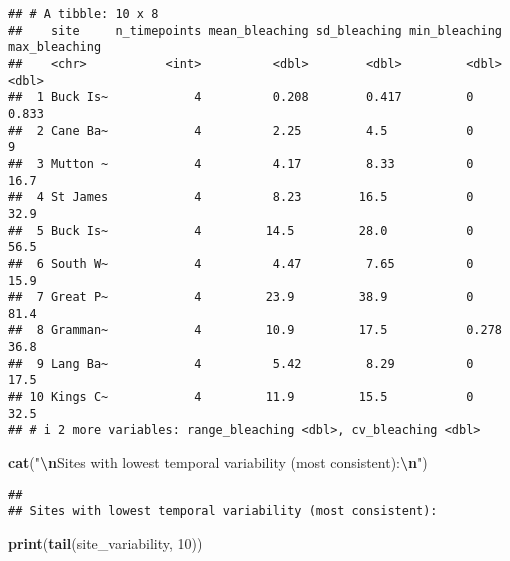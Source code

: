 \documentclass[
]{article}
\newenvironment{Shaded}{\begin{snugshade}}{\end{snugshade}}
\newcommand{\DecValTok}[1]{\textcolor[rgb]{0.00,0.00,0.81}{#1}}
\newcommand{\FunctionTok}[1]{\textcolor[rgb]{0.13,0.29,0.53}{\textbf{#1}}}
\newcommand{\NormalTok}[1]{#1}
\newcommand{\SpecialCharTok}[1]{\textcolor[rgb]{0.81,0.36,0.00}{\textbf{#1}}}
\newcommand{\StringTok}[1]{\textcolor[rgb]{0.31,0.60,0.02}{#1}}
\begin{document}
\begin{verbatim}
## # A tibble: 10 x 8
##    site     n_timepoints mean_bleaching sd_bleaching min_bleaching max_bleaching
##    <chr>           <int>          <dbl>        <dbl>         <dbl>         <dbl>
##  1 Buck Is~            4          0.208        0.417         0             0.833
##  2 Cane Ba~            4          2.25         4.5           0             9    
##  3 Mutton ~            4          4.17         8.33          0            16.7  
##  4 St James            4          8.23        16.5           0            32.9  
##  5 Buck Is~            4         14.5         28.0           0            56.5  
##  6 South W~            4          4.47         7.65          0            15.9  
##  7 Great P~            4         23.9         38.9           0            81.4  
##  8 Gramman~            4         10.9         17.5           0.278        36.8  
##  9 Lang Ba~            4          5.42         8.29          0            17.5  
## 10 Kings C~            4         11.9         15.5           0            32.5  
## # i 2 more variables: range_bleaching <dbl>, cv_bleaching <dbl>
\end{verbatim}

\begin{Shaded}
\begin{Highlighting}[]
\FunctionTok{cat}\NormalTok{(}\StringTok{"}\SpecialCharTok{\textbackslash{}n}\StringTok{Sites with lowest temporal variability (most consistent):}\SpecialCharTok{\textbackslash{}n}\StringTok{"}\NormalTok{) }
\end{Highlighting}
\end{Shaded}

\begin{verbatim}
## 
## Sites with lowest temporal variability (most consistent):
\end{verbatim}

\begin{Shaded}
\begin{Highlighting}[]
\FunctionTok{print}\NormalTok{(}\FunctionTok{tail}\NormalTok{(site\_variability, }\DecValTok{10}\NormalTok{))}
\end{Highlighting}
\end{Shaded}
\end{document}
